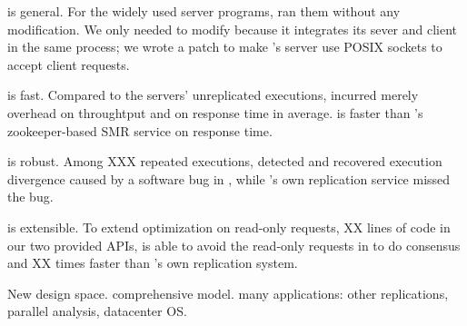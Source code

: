 \begin{tightenum}
\item \xxx is general. For the \npopularprog widely used server programs, \xxx 
ran them without any modification. We only needed to modify \calvin because it 
integrates its sever and client in the same process; we wrote a \nlinescalvin 
patch to make \calvin's server use POSIX sockets to accept client requests.

\item \xxx is fast. Compared to the \nprog servers' unreplicated executions, 
\xxx incurred merely \tputoverhead overhead on throughtput and \latencyoverhead 
on response time in average. \xxx is \fasterthanzookeeper faster than \calvin's 
zookeeper-based SMR service on response time.

\item \xxx is robust. Among XXX repeated executions, \xxx detected and 
recovered execution divergence caused by a software bug in \redis, while 
\redis's own replication service missed the bug.

\item \xxx is extensible. To extend optimization on read-only requests, XX 
lines of code in our two provided APIs, \xxx is able to avoid the read-only 
requests in \redis to do consensus and XX times faster than \redis's own 
replication system. 

\end{tightenum}  

New design space. comprehensive model. many applications: other replications, 
parallel analysis, datacenter OS.

